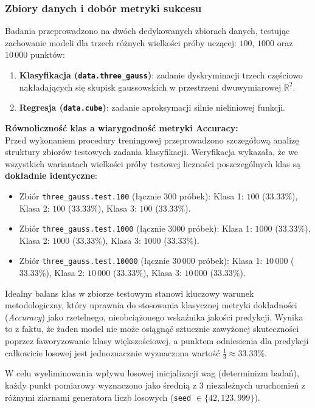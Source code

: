 \documentclass[11pt,a4paper]{article}
\begin{document}
\subsubsection{Zbiory danych i dobór metryki sukcesu}
Badania przeprowadzono na dwóch dedykowanych zbiorach danych, testując zachowanie modeli dla trzech różnych wielkości próby uczącej: $100$, $1000$ oraz $10\,000$ punktów:
\begin{enumerate}
    \item \textbf{Klasyfikacja (\texttt{data.three\_gauss})}: zadanie dyskryminacji trzech częściowo nakładających się skupisk gaussowskich w przestrzeni dwuwymiarowej $\mathbb{R}^2$.
    \item \textbf{Regresja (\texttt{data.cube})}: zadanie aproksymacji silnie nieliniowej funkcji.
\end{enumerate}

\noindent\textbf{Równoliczność klas a wiarygodność metryki Accuracy:}\\
Przed wykonaniem procedury treningowej przeprowadzono szczegółową analizę struktury zbiorów testowych zadania klasyfikacji. Weryfikacja wykazała, że we wszystkich wariantach wielkości próby testowej liczności poszczególnych klas są \textbf{dokładnie identyczne}:
\begin{itemize}
    \item Zbiór \texttt{three\_gauss.test.100} (łącznie $300$ próbek): Klasa 1: $100$ ($33.33\%$), Klasa 2: $100$ ($33.33\%$), Klasa 3: $100$ ($33.33\%$).
    \item Zbiór \texttt{three\_gauss.test.1000} (łącznie $3000$ próbek): Klasa 1: $1000$ ($33.33\%$), Klasa 2: $1000$ ($33.33\%$), Klasa 3: $1000$ ($33.33\%$).
    \item Zbiór \texttt{three\_gauss.test.10000} (łącznie $30\,000$ próbek): Klasa 1: $10\,000$ ($33.33\%$), Klasa 2: $10\,000$ ($33.33\%$), Klasa 3: $10\,000$ ($33.33\%$).
\end{itemize}
Idealny balans klas w zbiorze testowym stanowi kluczowy warunek metodologiczny, który uprawnia do stosowania klasycznej metryki dokładności (\emph{Accuracy}) jako rzetelnego, nieobciążonego wskaźnika jakości predykcji. Wynika to z faktu, że żaden model nie może osiągnąć sztucznie zawyżonej skuteczności poprzez faworyzowanie klasy większościowej, a punktem odniesienia dla predykcji całkowicie losowej jest jednoznacznie wyznaczona wartość $\frac{1}{3} \approx 33.33\%$.

W celu wyeliminowania wpływu losowej inicjalizacji wag (determinizm badań), każdy punkt pomiarowy wyznaczono jako średnią z $3$ niezależnych uruchomień z różnymi ziarnami generatora liczb losowych (\texttt{seed} $\in \{42, 123, 999\}$).
\end{document}
